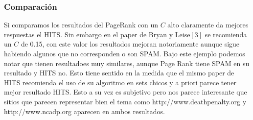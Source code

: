 \subsubsection{Comparación}

Si comparamos los resultados del PageRank con un $C$ alto claramente da mejores respuestas el HITS. Sin embargo en el paper de Bryan y Leise$[3]$ se recomienda un $C$ de 0.15, con este valor los resultados mejoran notoriamente aunque sigue habiendo algunos que no corresponden o son SPAM. 
Bajo este ejemplo podemos notar que tienen resultadoes muy similares, aunque Page Rank tiene SPAM en su resultado y HITS no. Esto tiene sentido en la medida que el mismo paper de HITS recomienda el uso de su algoritmo en sets chicos y a priori parece tener mejor resultado HITS. Esto a su vez es subjetivo pero nos parece interesante que sitios que parecen representar bien el tema como http://www.deathpenalty.org y http://www.ncadp.org aparecen en ambos resultados.